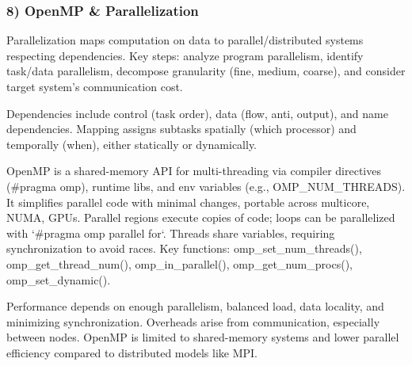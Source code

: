 \subsubsection*{8) OpenMP \& Parallelization}
Parallelization maps computation on data to parallel/distributed systems respecting dependencies. Key steps: analyze program parallelism, identify task/data parallelism, decompose granularity (fine, medium, coarse), and consider target system's communication cost.

Dependencies include control (task order), data (flow, anti, output), and name dependencies. Mapping assigns subtasks spatially (which processor) and temporally (when), either statically or dynamically.

OpenMP is a shared-memory API for multi-threading via compiler directives (\#pragma omp), runtime libs, and env variables (e.g., OMP\_NUM\_THREADS). It simplifies parallel code with minimal changes, portable across multicore, NUMA, GPUs. Parallel regions execute copies of code; loops can be parallelized with `\#pragma omp parallel for`. Threads share variables, requiring synchronization to avoid races. Key functions: omp\_set\_num\_threads(), omp\_get\_thread\_num(), omp\_in\_parallel(), omp\_get\_num\_procs(), omp\_set\_dynamic().

Performance depends on enough parallelism, balanced load, data locality, and minimizing synchronization. Overheads arise from communication, especially between nodes. OpenMP is limited to shared-memory systems and lower parallel efficiency compared to distributed models like MPI.


